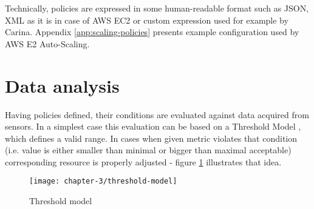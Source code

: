 Technically, policies are expressed in some human-readable format such as JSON, XML as it is in case of AWS EC2 or custom expression used for example by Carina. Appendix \ref{app:scaling-policies} presents example configuration used by AWS E2 Auto-Scaling.

\section{Data analysis}
Having policies defined, their conditions are evaluated against data acquired from sensors. In a simplest case this evaluation can be based on a Threshold Model \cite{LiWoZh05}, which defines a valid range. In cases when given metric violates that condition (i.e. value is either smaller than minimal or bigger than maximal acceptable) corresponding resource is properly adjusted - figure \ref{ch3:threshold-model} illustrates that idea.

\begin{figure}[!ht]
  \begin{center}
    \texttt{[image: chapter-3/threshold-model]}
  \end{center}
  \caption{Threshold model}
  \label{ch3:threshold-model}
\end{figure}

